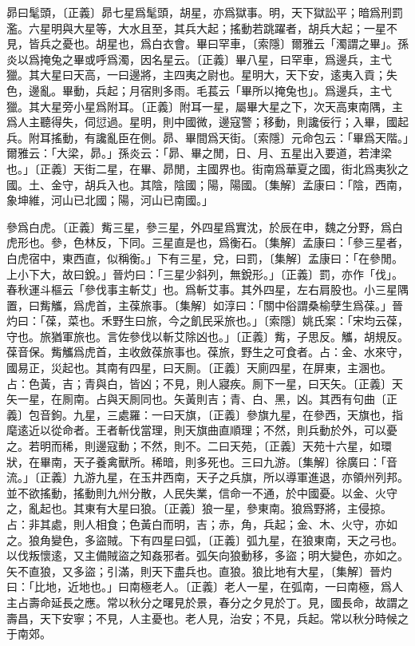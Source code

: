 昴曰髦頭，〔正義〕昴七星爲髦頭，胡星，亦爲獄事。明，天下獄訟平；暗爲刑罰濫。六星明與大星等，大水且至，其兵大起；搖動若跳躍者，胡兵大起；一星不見，皆兵之憂也。胡星也，爲白衣會。畢曰罕車，〔索隱〕爾雅云「濁謂之畢」。孫炎以爲掩兔之畢或呼爲濁，因名星云。〔正義〕畢八星，曰罕車，爲邊兵，主弋獵。其大星曰天高，一曰邊將，主四夷之尉也。星明大，天下安，逺夷入貢；失色，邊亂。畢動，兵起；月宿則多雨。毛萇云「畢所以掩兔也」。爲邊兵，主弋獵。其大星旁小星爲附耳。〔正義〕附耳一星，屬畢大星之下，次天高東南隅，主爲人主聽得失，伺愆過。星明，則中國微，邊寇警；移動，則讒佞行；入畢，國起兵。附耳搖動，有讒亂臣在側。昴、畢間爲天街。〔索隱〕元命包云：「畢爲天階。」爾雅云：「大梁，昴。」孫炎云：「昴、畢之閒，日、月、五星出入要道，若津梁也。」〔正義〕天街二星，在畢、昴閒，主國界也。街南爲華夏之國，街北爲夷狄之國。土、金守，胡兵入也。其陰，陰國；陽，陽國。〔集解〕孟康曰：「陰，西南，象坤維，河山已北國；陽，河山已南國。」

參爲白虎。〔正義〕觜三星，參三星，外四星爲實沈，於辰在申，魏之分野，爲白虎形也。參，色林反，下同。三星直是也，爲衡石。〔集解〕孟康曰：「參三星者，白虎宿中，東西直，似稱衡。」下有三星，兌，曰罰，〔集解〕孟康曰：「在參閒。上小下大，故曰銳。」晉灼曰：「三星少斜列，無銳形。」〔正義〕罰，亦作「伐」。春秋運斗樞云「參伐事主斬艾」也。爲斬艾事。其外四星，左右肩股也。小三星隅置，曰觜觿，爲虎首，主葆旅事。〔集解〕如淳曰：「關中俗謂桑榆孽生爲葆。」晉灼曰：「葆，菜也。禾野生曰旅，今之飢民采旅也。」〔索隱〕姚氏案：「宋均云葆，守也。旅猶軍旅也。言佐參伐以斬艾除凶也。」〔正義〕觜，子思反。觿，胡規反。葆音保。觜觿爲虎首，主收斂葆旅事也。葆旅，野生之可食者。占：金、水來守，國易正，災起也。其南有四星，曰天厠。〔正義〕天廁四星，在屏東，主溷也。占：色黃，吉；青與白，皆凶；不見，則人寢疾。厠下一星，曰天矢。〔正義〕天矢一星，在厠南。占與天厠同也。矢黃則吉；青、白、黑，凶。其西有句曲〔正義〕包音鉤。九星，三處羅：一曰天旗，〔正義〕參旗九星，在參西，天旗也，指麾逺近以從命者。王者斬伐當理，則天旗曲直順理；不然，則兵動於外，可以憂之。若明而稀，則邊寇動；不然，則不。二曰天苑，〔正義〕天苑十六星，如環狀，在畢南，天子養禽獸所。稀暗，則多死也。三曰九游。〔集解〕徐廣曰：「音流。」〔正義〕九游九星，在玉井西南，天子之兵旗，所以導軍進退，亦領州列邦。並不欲搖動，搖動則九州分散，人民失業，信命一不通，於中國憂。以金、火守之，亂起也。其東有大星曰狼。〔正義〕狼一星，參東南。狼爲野將，主侵掠。占：非其處，則人相食；色黃白而明，吉；赤，角，兵起；金、木、火守，亦如之。狼角變色，多盜賊。下有四星曰弧，〔正義〕弧九星，在狼東南，天之弓也。以伐叛懷逺，又主備賊盜之知姦邪者。弧矢向狼動移，多盜；明大變色，亦如之。矢不直狼，又多盜；引滿，則天下盡兵也。直狼。狼比地有大星，〔集解〕晉灼曰：「比地，近地也。」曰南極老人。〔正義〕老人一星，在弧南，一曰南極，爲人主占壽命延長之應。常以秋分之曙見於景，春分之夕見於丁。見，國長命，故謂之壽昌，天下安寧；不見，人主憂也。老人見，治安；不見，兵起。常以秋分時候之于南郊。

